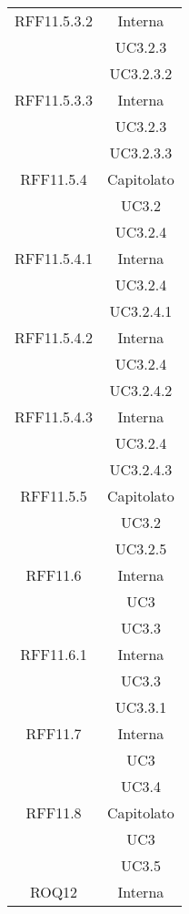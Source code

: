 \begin{longtable}{|c|c|}
\midrule
RFF11.5.3.2
& Interna\\
& UC3.2.3\\
& UC3.2.3.2\\

\midrule
RFF11.5.3.3
& Interna\\
& UC3.2.3\\
& UC3.2.3.3\\

\midrule
RFF11.5.4
& Capitolato\\
& UC3.2\\
& UC3.2.4\\

\midrule
RFF11.5.4.1
& Interna\\
& UC3.2.4\\
& UC3.2.4.1\\

\midrule
RFF11.5.4.2
& Interna\\
& UC3.2.4\\
& UC3.2.4.2\\

\midrule
RFF11.5.4.3
& Interna\\
& UC3.2.4\\
& UC3.2.4.3\\

\midrule
RFF11.5.5
& Capitolato\\
& UC3.2\\
& UC3.2.5\\

\midrule
RFF11.6
& Interna\\
& UC3\\
& UC3.3\\

\midrule
RFF11.6.1
& Interna\\
& UC3.3\\
& UC3.3.1\\

\midrule
RFF11.7
& Interna\\
& UC3\\
& UC3.4\\

\midrule
RFF11.8
& Capitolato\\
& UC3\\
& UC3.5\\



\midrule
ROQ12
& Interna\\


\end{longtable}
